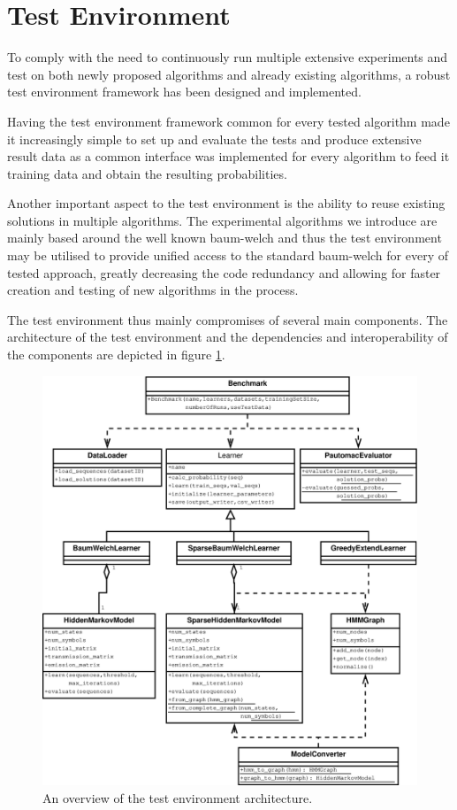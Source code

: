 \section{Test Environment}

To comply with the need to continuously run multiple extensive experiments and test on both newly proposed algorithms and already existing algorithms, a robust test environment framework has been designed and implemented.

Having the test environment framework common for every tested algorithm made it increasingly simple to set up and evaluate the tests and produce extensive result data as a common interface was implemented for every algorithm to feed it training data and obtain the resulting probabilities.

Another important aspect to the test environment is the ability to reuse existing solutions in multiple algorithms. The experimental algorithms we introduce are mainly based around the well known \gls{baum-welch} and thus the test environment may be utilised to provide unified access to the standard \gls{baum-welch} for every of tested approach, greatly decreasing the code redundancy and allowing for faster creation and testing of new algorithms in the process.

The test environment thus mainly compromises of several main components. The architecture of the test environment and the dependencies and interoperability of the components are depicted in figure \ref{fig:testenvironment}.

\begin{figure}[!htb]
\centering
\includegraphics[scale=.4]{pictures/test-environment-overview.eps}
\caption{An overview of the test environment architecture.}
\label{fig:testenvironment}
\end{figure}

